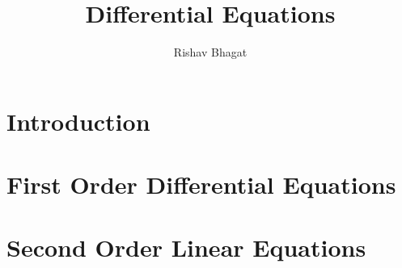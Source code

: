 \title{Differential Equations}

\author{Rishav Bhagat}

\maketitle
\chapter{Introduction}
    
    
    
\chapter{First Order Differential Equations}
    
    
    
    
    \graphicspath{{../chapter_2/section_2.5/}}
    
    
    \graphicspath{{../chapter_2/section_2.7/}}
    
    \graphicspath{{../chapter_2/section_2.8/}}
    
    \graphicspath{{../chapter_2/section_2.9/}}
    
\chapter{Second Order Linear Equations}
    \graphicspath{{../chapter_3/section_3.1/}}
    
    \graphicspath{{../chapter_3/section_3.2/}}
    
    \graphicspath{{../chapter_3/section_3.3/}}
    